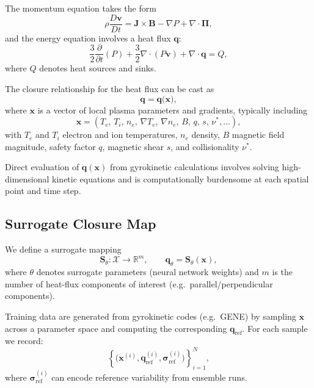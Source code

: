 \documentclass[11pt]{article}
\begin{document}
The momentum equation takes the form
\begin{equation}
  \rho \frac{D \bm{v}}{Dt} = \bm{J} \times \bm{B} - \nabla P + \nabla \cdot \bm{\Pi}, \label{eq:momentum}
\end{equation}
and the energy equation involves a heat flux $\bm{q}$:
\begin{equation}
  \frac{3}{2} \frac{\partial}{\partial t} (P) + \frac{3}{2} \nabla \cdot (P \bm{v}) + \nabla \cdot \bm{q} = Q,
  \label{eq:energy}
\end{equation}
where $Q$ denotes heat sources and sinks.

The closure relationship for the heat flux can be cast as
\begin{equation}
  \bm{q} = \bm{q}\big(\bm{x}\big),
\end{equation}
where $\bm{x}$ is a vector of local plasma parameters and gradients, typically including
\begin{equation}
  \bm{x} = \left( T_e,\, T_i,\, n_e,\, \nabla T_e,\, \nabla n_e,\, B,\, q,\, s,\, \nu^\ast, \ldots \right),
\end{equation}
with $T_e$ and $T_i$ electron and ion temperatures, $n_e$ density, $B$ magnetic field magnitude, safety factor $q$, magnetic shear $s$, and collisionality $\nu^\ast$.

Direct evaluation of $\bm{q}(\bm{x})$ from gyrokinetic calculations involves solving high-dimensional kinetic equations and is computationally burdensome at each spatial point and time step.

\subsection{Surrogate Closure Map}

We define a surrogate mapping
\begin{equation}
  \bm{S}_\theta : \mathcal{X} \to \mathbb{R}^m, \qquad \bm{q}_\theta = \bm{S}_\theta(\bm{x}),
\end{equation}
where $\theta$ denotes surrogate parameters (neural network weights) and $m$ is the number of heat-flux components of interest (e.g.\ parallel/perpendicular components).

Training data are generated from gyrokinetic codes (e.g.\ GENE) by sampling $\bm{x}$ across a parameter space and computing the corresponding $\bm{q}_\mathrm{ref}$. For each sample we record:
\begin{equation}
  \left\{ \big(\bm{x}^{(i)}, \bm{q}^{(i)}_\mathrm{ref}, \bm{\sigma}^{(i)}_\mathrm{ref}\big) \right\}_{i=1}^N,
\end{equation}
where $\bm{\sigma}^{(i)}_\mathrm{ref}$ can encode reference variability from ensemble runs.
\end{document}
